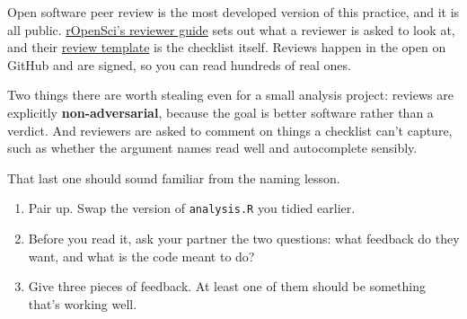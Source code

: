 \documentclass[
  letterpaper,
  justified,
  a4paper]{tufte-book}
\providecommand{\tightlist}{%
  \setlength{\itemsep}{0pt}\setlength{\parskip}{0pt}}
\providecommand{\tightlist}{%
  \setlength{\itemsep}{0pt}\setlength{\parskip}{0pt}}
\begin{document}
\begin{tcolorbox}[enhanced jigsaw, arc=.35mm, bottomrule=.15mm, bottomtitle=1mm, breakable, colback=white, colbacktitle=quarto-callout-tip-color!10!white, colframe=quarto-callout-tip-color-frame, coltitle=black, left=2mm, leftrule=.75mm, opacityback=0, opacitybacktitle=0.6, rightrule=.15mm, title=\textcolor{quarto-callout-tip-color}{\faLightbulb}\hspace{0.5em}{If you want to see this done at full scale}, titlerule=0mm, toprule=.15mm, toptitle=1mm]

Open software peer review is the most developed version of this
practice, and it is all public.
\href{https://devguide.ropensci.org/softwarereview_reviewer.html}{rOpenSci's
reviewer guide} sets out what a reviewer is asked to look at, and their
\href{https://devguide.ropensci.org/reviewtemplate.html}{review
template} is the checklist itself. Reviews happen in the open on GitHub
and are signed, so you can read hundreds of real ones.

Two things there are worth stealing even for a small analysis project:
reviews are explicitly \textbf{non-adversarial}, because the goal is
better software rather than a verdict. And reviewers are asked to
comment on things a checklist can't capture, such as whether the
argument names read well and autocomplete sensibly.

That last one should sound familiar from the naming lesson.

\end{tcolorbox}

\begin{tcolorbox}[enhanced jigsaw, arc=.35mm, bottomrule=.15mm, bottomtitle=1mm, breakable, colback=white, colbacktitle=quarto-callout-note-color!10!white, colframe=quarto-callout-note-color-frame, coltitle=black, left=2mm, leftrule=.75mm, opacityback=0, opacitybacktitle=0.6, rightrule=.15mm, title=\textcolor{quarto-callout-note-color}{\faInfo}\hspace{0.5em}{Your Turn}, titlerule=0mm, toprule=.15mm, toptitle=1mm]

\begin{enumerate}
\def\labelenumi{\arabic{enumi}.}
\tightlist
\item
  Pair up. Swap the version of \texttt{analysis.R} you tidied earlier.
\item
  Before you read it, ask your partner the two questions: what feedback
  do they want, and what is the code meant to do?
\item
  Give three pieces of feedback. At least one of them should be
  something that's working well.
\end{enumerate}

\end{tcolorbox}
\end{document}
